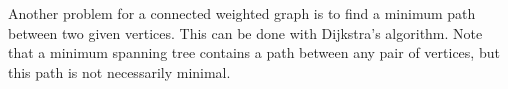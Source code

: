 

\setcounter{section}{2}
\setcounter{subsection}{6}
\setcounter{dfn}{19}

\begin{rem}
Another problem for a connected weighted graph is to find a minimum path between two given vertices.
This can be done with Dijkstra's algorithm.
Note that a minimum spanning tree contains a path between any pair of vertices, but this path is not necessarily minimal.
\end{rem}



